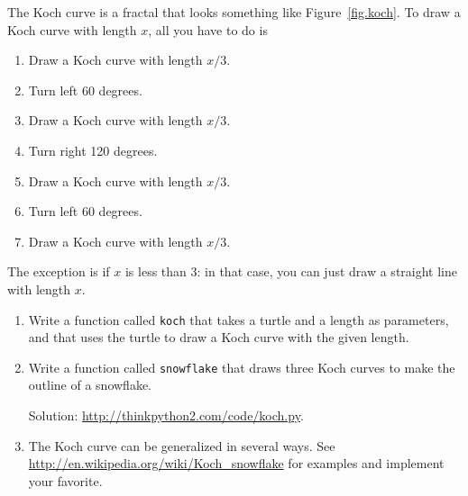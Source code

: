 \begin{exercise}

The Koch curve is a fractal that looks something like
Figure~\ref{fig.koch}.  To draw a Koch curve with length $x$, all you
have to do is

\begin{enumerate}

\item Draw a Koch curve with length $x/3$.

\item Turn left 60 degrees.

\item Draw a Koch curve with length $x/3$.

\item Turn right 120 degrees.

\item Draw a Koch curve with length $x/3$.

\item Turn left 60 degrees.

\item Draw a Koch curve with length $x/3$.

\end{enumerate}

The exception is if $x$ is less than 3: in that case,
you can just draw a straight line with length $x$.

\begin{enumerate}

\item Write a function called {\tt koch} that takes a turtle and
a length as parameters, and that uses the turtle to draw a Koch
curve with the given length.

\item Write a function called {\tt snowflake} that draws three
Koch curves to make the outline of a snowflake.

Solution: \url{http://thinkpython2.com/code/koch.py}.

\item The Koch curve can be generalized in several ways.  See
\url{http://en.wikipedia.org/wiki/Koch_snowflake} for examples and
implement your favorite.

\end{enumerate}
\end{exercise}